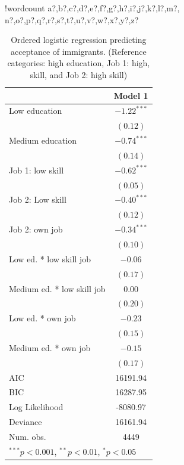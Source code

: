 \documentclass{article}\usepackage[]{graphicx}\usepackage[]{color}
\newcounter{words}
\newenvironment{counted}{%
\setcounter{words}{0}
\SearchList!{wordcount}{\stepcounter{words}}
{a?,b?,c?,d?,e?,f?,g?,h?,i?,j?,k?,l?,m?,
n?,o?,p?,q?,r?,s?,t?,u?,v?,w?,x?,y?,z?}
\UndoBoundary{'}
\SearchOrder{p;}}{%
\StopSearching}
\begin{document}
\begin{counted}
\begin{table}
\begin{center}
\begin{tabular}{l c }
\hline
 & Model 1 \\
\hline
Low education              & $-1.22^{***}$ \\
                           & $(0.12)$      \\
Medium education           & $-0.74^{***}$ \\
                           & $(0.14)$      \\
Job 1: low skill           & $-0.62^{***}$ \\
                           & $(0.05)$      \\
Job 2: Low skill           & $-0.40^{***}$ \\
                           & $(0.12)$      \\
Job 2: own job             & $-0.34^{***}$ \\
                           & $(0.10)$      \\
Low ed. * low skill job    & $-0.06$       \\
                           & $(0.17)$      \\
Medium ed. * low skill job & $0.00$        \\
                           & $(0.20)$      \\
Low ed. * own job          & $-0.23$       \\
                           & $(0.15)$      \\
Medium ed. * own job       & $-0.15$       \\
                           & $(0.17)$      \\
\hline
AIC                        & 16191.94      \\
BIC                        & 16287.95      \\
Log Likelihood             & -8080.97      \\
Deviance                   & 16161.94      \\
Num. obs.                  & 4449          \\
\hline
\multicolumn{2}{l}{\scriptsize{$^{***}p<0.001$, $^{**}p<0.01$, $^*p<0.05$}}
\end{tabular}
\caption{Ordered logistic regression predicting acceptance of immigrants. (Reference categories: high education, Job 1: high, skill, and Job 2: high skill)}
\label{table:mainLabMarket}
\end{center}
\end{table}




\end{counted}
\end{document}
